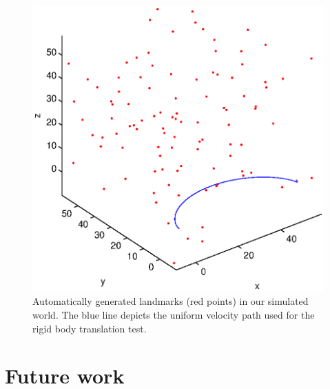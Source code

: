 \documentclass[letterpaper]{article}
\begin{document}
\begin{figure}[h!tbp]
\centering
\includegraphics[width=0.5\linewidth]{uniform_points}
\caption{Automatically generated landmarks (red points) in our simulated
  world. The blue line depicts the uniform velocity path used for the
  rigid body translation test.}
\label{fig:TranslationTest-uniformPoints}
\end{figure}

\section{Future work}

\end{document}
